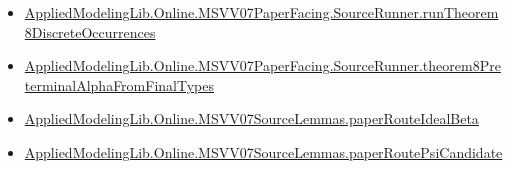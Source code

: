 \documentclass[10pt]{article}
\begin{document}
\begin{itemize}
\item \hyperlink{governing-declaration-d071ebd3a5ae7962}{Applied\allowbreak{}Modeling\allowbreak{}Lib.\allowbreak{}Online.\allowbreak{}MSVV07\allowbreak{}Paper\allowbreak{}Facing.\allowbreak{}Source\allowbreak{}Runner.\allowbreak{}run\allowbreak{}Theorem8\allowbreak{}Discrete\allowbreak{}Occurrences}
\item \hyperlink{governing-declaration-ee96e332356b7bcd}{Applied\allowbreak{}Modeling\allowbreak{}Lib.\allowbreak{}Online.\allowbreak{}MSVV07\allowbreak{}Paper\allowbreak{}Facing.\allowbreak{}Source\allowbreak{}Runner.\allowbreak{}theorem8\allowbreak{}Preterminal\allowbreak{}Alpha\allowbreak{}From\allowbreak{}Final\allowbreak{}Types}
\item \hyperlink{governing-declaration-c22e713da25eb3dc}{Applied\allowbreak{}Modeling\allowbreak{}Lib.\allowbreak{}Online.\allowbreak{}MSVV07\allowbreak{}Source\allowbreak{}Lemmas.\allowbreak{}paper\allowbreak{}Route\allowbreak{}Ideal\allowbreak{}Beta}
\item \hyperlink{governing-declaration-05c17985c30d0eaf}{Applied\allowbreak{}Modeling\allowbreak{}Lib.\allowbreak{}Online.\allowbreak{}MSVV07\allowbreak{}Source\allowbreak{}Lemmas.\allowbreak{}paper\allowbreak{}Route\allowbreak{}Psi\allowbreak{}Candidate}
\end{itemize}
\end{document}
